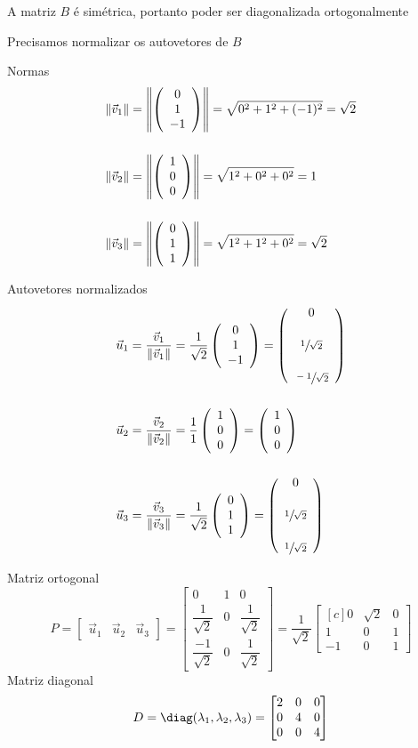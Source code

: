 \documentclass[a4paper,12pt,fleqn]{article}
\begin{document}
\begin{answer}
  A matriz $B$ é simétrica, portanto poder ser diagonalizada ortogonalmente

  Precisamos normalizar os autovetores de $B$

  Normas
  \begin{align*}
    \norm{\vec{v}_1}
    & = \norm{\vetortri{0}{1}{-1}}
    = \sqrt{0^2 + 1^2 + (-1)^2}
    = \sqrt{2}
    \\[5mm]
    \norm{\vec{v}_2}
    & = \norm{\vetortri{1}{0}{0}}
    = \sqrt{1^2 + 0^2 + 0^2}
    = 1
    \\[5mm]
    \norm{\vec{v}_3}
    & = \norm{\vetortri{0}{1}{1}}
    = \sqrt{1^2 + 1^2 + 0^2}
    = \sqrt{2}
  \end{align*}

  Autovetores normalizados
  \begin{align*}
    \vec{u}_1
    & = \frac{\vec{v}_1}{\norm{\vec{v}_1}}
    = \frac{1}{\sqrt{2}} \vetortri{0}{1}{-1}
    = \Vetortri{0}{\sfrac{1}{\sqrt{2}}}{\sfrac{-1}{\sqrt{2}}}
    \\[5mm]
    \vec{u}_2
    & = \frac{\vec{v}_2}{\norm{\vec{v}_2}}
    = \frac{1}{1} \vetortri{1}{0}{0}
    = \vetortri{1}{0}{0}
    \\[5mm]
    \vec{u}_3
    & = \frac{\vec{v}_3}{\norm{\vec{v}_3}}
    = \frac{1}{\sqrt{2}} \vetortri{0}{1}{1}
    = \Vetortri{0}{\sfrac{1}{\sqrt{2}}}{\sfrac{1}{\sqrt{2}}}
  \end{align*}

  Matriz ortogonal
  \[
    P
    = \begin{bmatrix}
      \vec{u}_1 & \vec{u}_2 & \vec{u}_3
    \end{bmatrix}
    = \begin{bmatrix}
      0                    & 1 & 0                   \\[3mm]
      \dfrac{1}{\sqrt{2}}  & 0 & \dfrac{1}{\sqrt{2}} \\[3mm]
      \dfrac{-1}{\sqrt{2}} & 0 & \dfrac{1}{\sqrt{2}}
    \end{bmatrix}
    = \frac{1}{\sqrt{2}} \begin{bmatrix}[c]
      0  & \sqrt{2} & 0 \\
      1  & 0        & 1 \\
      -1 & 0        & 1
    \end{bmatrix}
  \]
  Matriz diagonal
  \[
    D
    = \diag( \lambda_1, \lambda_2, \lambda_3 )
    = \begin{bmatrix}
      2 & 0 & 0 \\
      0 & 4 & 0 \\
      0 & 0 & 4
    \end{bmatrix}
  \]
\end{answer}
\end{document}
